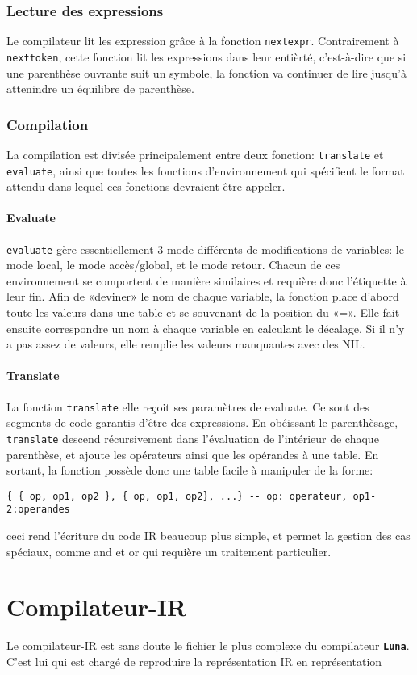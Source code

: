 \documentclass{article}
\newcommand{\luna}{\textbf{\texttt{Luna}}}
\begin{document}
\subsubsection{Lecture des expressions}
Le compilateur lit les expression grâce à la fonction \texttt{nextexpr}. Contrairement à \texttt{nexttoken}, cette fonction lit les expressions dans leur entièrté, c'est-à-dire que si une parenthèse ouvrante suit un symbole, la fonction va continuer de lire jusqu'à attenindre un équilibre de parenthèse.

\subsubsection{Compilation}
La compilation est divisée principalement entre deux fonction: \texttt{translate} et \texttt{evaluate}, ainsi que toutes les fonctions d'environnement qui spécifient le format attendu dans lequel ces fonctions devraient être appeler.

\paragraph{Evaluate}
\texttt{evaluate} gère essentiellement 3 mode différents de modifications de variables: le mode local, le mode accès/global, et le mode retour. Chacun de ces environnement se comportent de manière similaires et requière donc l'étiquette à leur fin. Afin de «deviner» le nom de chaque variable, la fonction place d'abord toute les valeurs dans une table et se souvenant de la position du «=». Elle fait ensuite correspondre un nom à chaque variable en calculant le décalage. Si il n'y a pas assez de valeurs, elle remplie les valeurs manquantes avec des NIL.

\paragraph{Translate}
La fonction \texttt{translate} elle reçoit ses paramètres de evaluate. Ce sont des segments de code garantis d'être des expressions. En obéissant le parenthèsage, \texttt{translate} descend récursivement dans l'évaluation de l'intérieur de chaque parenthèse, et ajoute les opérateurs ainsi que les opérandes à une table. En sortant, la fonction possède donc une table facile à manipuler de la forme:
\begin{lstlisting}[belowcaptionskip = -1\baselineskip]
  { { op, op1, op2 }, { op, op1, op2}, ...} -- op: operateur, op1-2:operandes
\end{lstlisting}
ceci rend l'écriture du code IR beaucoup plus simple, et permet la gestion des cas spéciaux, comme and et or qui requière un traitement particulier.

\section{Compilateur-IR}
Le compilateur-IR est sans doute le fichier le plus complexe du compilateur \luna{}. C'est lui qui est chargé de reproduire la représentation IR en représentation 
\end{document}
